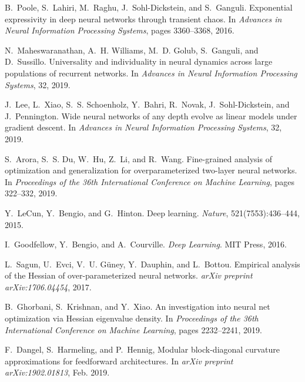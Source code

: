\documentclass[a4paper,12pt]{article}
\begin{document}
\begin{thebibliography}{99}

  B.~Poole, S.~Lahiri, M.~Raghu, J.~Sohl-Dickstein, and S.~Ganguli.
  \newblock Exponential expressivity in deep neural networks through transient chaos.
  \newblock In \emph{Advances in Neural Information Processing Systems}, pages 3360--3368, 2016.

  N.~Maheswaranathan, A.~H. Williams, M.~D. Golub, S.~Ganguli, and D.~Sussillo.
  \newblock Universality and individuality in neural dynamics across large populations of recurrent networks.
  \newblock In \emph{Advances in Neural Information Processing Systems}, 32, 2019.

  J.~Lee, L.~Xiao, S.~S. Schoenholz, Y.~Bahri, R.~Novak, J.~Sohl-Dickstein, and J.~Pennington.
  \newblock Wide neural networks of any depth evolve as linear models under gradient descent.
  \newblock In \emph{Advances in Neural Information Processing Systems}, 32, 2019.

  S.~Arora, S.~S. Du, W.~Hu, Z.~Li, and R.~Wang.
  \newblock Fine-grained analysis of optimization and generalization for overparameterized two-layer neural networks.
  \newblock In \emph{Proceedings of the 36th International Conference on Machine Learning}, pages 322--332, 2019.

  Y.~LeCun, Y.~Bengio, and G.~Hinton.
  \newblock Deep learning.
  \newblock \emph{Nature}, 521(7553):436--444, 2015.

  I.~Goodfellow, Y.~Bengio, and A.~Courville.
  \newblock \emph{Deep Learning}.
  \newblock MIT Press, 2016.

  L.~Sagun, U.~Evci, V.~U. Güney, Y.~Dauphin, and L.~Bottou.
  \newblock Empirical analysis of the Hessian of over-parameterized neural networks.
  \newblock \emph{arXiv preprint arXiv:1706.04454}, 2017.

  B.~Ghorbani, S.~Krishnan, and Y.~Xiao.
  \newblock An investigation into neural net optimization via Hessian eigenvalue density.
  \newblock In \emph{Proceedings of the 36th International Conference on Machine Learning}, pages 2232--2241, 2019.

  F.~Dangel, S.~Harmeling, and P.~Hennig,
  \newblock Modular block-diagonal curvature approximations for feedforward architectures.
  \newblock In \emph{arXiv preprint arXiv:1902.01813}, Feb. 2019.


\end{thebibliography}
\end{document}
